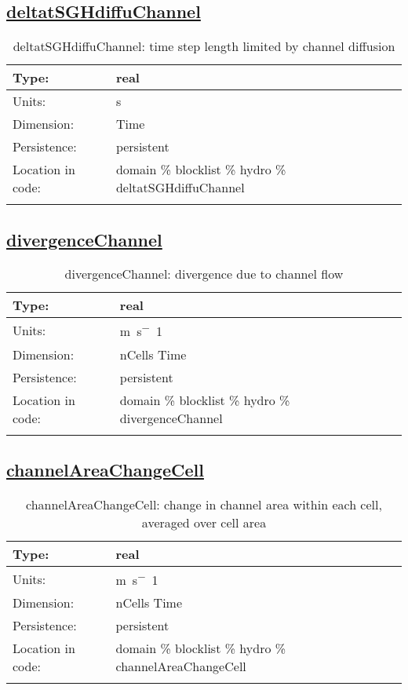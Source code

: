 \subsection[deltatSGHdiffuChannel]{\hyperref[sec:var_tab_hydro]{deltatSGHdiffuChannel}}
\label{subsec:var_sec_hydro_deltatSGHdiffuChannel}
\begin{center}
\begin{longtable}{| p{2.0in} | p{4.0in} |}
        \hline 
        Type: & real \\
        \hline 
        Units: & \si{s} \\
        \hline 
        Dimension: & Time \\
        \hline 
        Persistence: & persistent \\
        \hline 
         Location in code: & domain \% blocklist \% hydro \% deltatSGHdiffuChannel \\
         \hline 
    \caption{deltatSGHdiffuChannel: time step length limited by channel diffusion}
\end{longtable}
\end{center}
\subsection[divergenceChannel]{\hyperref[sec:var_tab_hydro]{divergenceChannel}}
\label{subsec:var_sec_hydro_divergenceChannel}
\begin{center}
\begin{longtable}{| p{2.0in} | p{4.0in} |}
        \hline 
        Type: & real \\
        \hline 
        Units: & \si{m.s^-1} \\
        \hline 
        Dimension: & nCells Time \\
        \hline 
        Persistence: & persistent \\
        \hline 
         Location in code: & domain \% blocklist \% hydro \% divergenceChannel \\
         \hline 
    \caption{divergenceChannel: divergence due to channel flow}
\end{longtable}
\end{center}
\subsection[channelAreaChangeCell]{\hyperref[sec:var_tab_hydro]{channelAreaChangeCell}}
\label{subsec:var_sec_hydro_channelAreaChangeCell}
\begin{center}
\begin{longtable}{| p{2.0in} | p{4.0in} |}
        \hline 
        Type: & real \\
        \hline 
        Units: & \si{m.s^-1} \\
        \hline 
        Dimension: & nCells Time \\
        \hline 
        Persistence: & persistent \\
        \hline 
         Location in code: & domain \% blocklist \% hydro \% channelAreaChangeCell \\
         \hline 
    \caption{channelAreaChangeCell: change in channel area within each cell, averaged over cell area}
\end{longtable}
\end{center}
